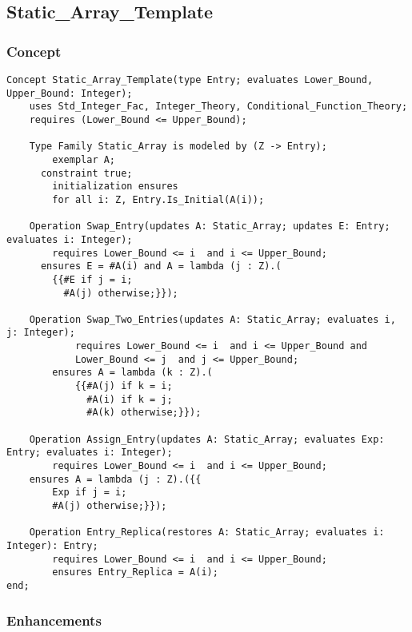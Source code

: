 	\subsection{Static\_Array\_Template}	%

		\subsubsection{Concept}	%

\begin{lstlisting}[language=resolve]
Concept Static_Array_Template(type Entry; evaluates Lower_Bound, Upper_Bound: Integer);
    uses Std_Integer_Fac, Integer_Theory, Conditional_Function_Theory;
    requires (Lower_Bound <= Upper_Bound);

    Type Family Static_Array is modeled by (Z -> Entry);
        exemplar A;
      constraint true;
        initialization ensures 
		for all i: Z, Entry.Is_Initial(A(i));

    Operation Swap_Entry(updates A: Static_Array; updates E: Entry; evaluates i: Integer); 
        requires Lower_Bound <= i  and i <= Upper_Bound;
	  ensures E = #A(i) and A = lambda (j : Z).(
		{{#E if j = i;
		  #A(j) otherwise;}});

	Operation Swap_Two_Entries(updates A: Static_Array; evaluates i, j: Integer); 
        	requires Lower_Bound <= i  and i <= Upper_Bound and
			Lower_Bound <= j  and j <= Upper_Bound;
		ensures A = lambda (k : Z).(
			{{#A(j) if k = i; 
			  #A(i) if k = j; 
			  #A(k) otherwise;}});

    Operation Assign_Entry(updates A: Static_Array; evaluates Exp: Entry; evaluates i: Integer);
        requires Lower_Bound <= i  and i <= Upper_Bound;
	ensures A = lambda (j : Z).({{
		Exp if j = i;
		#A(j) otherwise;}});

    Operation Entry_Replica(restores A: Static_Array; evaluates i: Integer): Entry;
        requires Lower_Bound <= i  and i <= Upper_Bound;
        ensures Entry_Replica = A(i);
end;
\end{lstlisting}

		\subsubsection{Enhancements}	%

